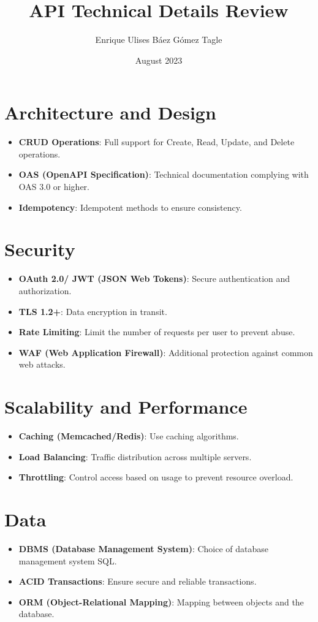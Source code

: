 \documentclass[12pt]{article}
\title{API Technical Details Review}
\author{Enrique Ulises Báez Gómez Tagle}
\date{August 2023}
\begin{document}
\maketitle

\section{Architecture and Design}
\begin{itemize}
    \item \textbf{CRUD Operations}: Full support for Create, Read, Update, and Delete operations.
    \item \textbf{OAS (OpenAPI Specification)}: Technical documentation complying with OAS 3.0 or higher.
    \item \textbf{Idempotency}: Idempotent methods to ensure consistency.
\end{itemize}

\section{Security}
\begin{itemize}
    \item \textbf{OAuth 2.0/ JWT (JSON Web Tokens)}: Secure authentication and authorization.
    \item \textbf{TLS 1.2+}: Data encryption in transit.
    \item \textbf{Rate Limiting}: Limit the number of requests per user to prevent abuse.
    \item \textbf{WAF (Web Application Firewall)}: Additional protection against common web attacks.
\end{itemize}

\section{Scalability and Performance}
\begin{itemize}
    \item \textbf{Caching (Memcached/Redis)}: Use caching algorithms.
    \item \textbf{Load Balancing}: Traffic distribution across multiple servers.
    \item \textbf{Throttling}: Control access based on usage to prevent resource overload.
\end{itemize}

\section{Data}
\begin{itemize}
    \item \textbf{DBMS (Database Management System)}: Choice of database management system SQL.
    \item \textbf{ACID Transactions}: Ensure secure and reliable transactions.
    \item \textbf{ORM (Object-Relational Mapping)}: Mapping between objects and the database.
\end{itemize}
\end{document}
